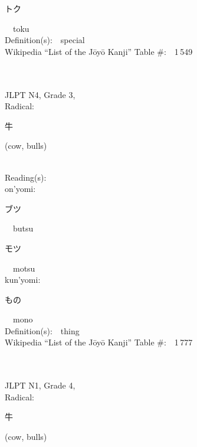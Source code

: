 \begin{multicols}{2}
{\hspace*{2em}}{\begin{CJK}{UTF8}{min} トク \end{CJK}}\ \ toku\ \ \\
Definition(s):\ \ special \\
Wikipedia ``List of the J\=oy\=o Kanji'' Table \#:\ \ 1\,549 \\
\ \ \\
{\fontsize{34pt}{40pt}  }\ \ \\  %
{JLPT N4, Grade 3, \\Radical:\ \ {\begin{CJK}{UTF8}{min} 牛 \end{CJK}} (cow, bulls) } \\
Reading(s):\ \ \\
{\hspace*{1em}}on'yomi:\ \ \\
{\hspace*{2em}}{\begin{CJK}{UTF8}{min} ブツ \end{CJK}}\ \ butsu\ \ \\
{\hspace*{2em}}{\begin{CJK}{UTF8}{min} モツ \end{CJK}}\ \ motsu\ \ \\
{\hspace*{1em}}kun'yomi:\ \ \\
{\hspace*{2em}}{\begin{CJK}{UTF8}{min} もの \end{CJK}}\ \ mono\ \ \\
Definition(s):\ \ thing \\
Wikipedia ``List of the J\=oy\=o Kanji'' Table \#:\ \ 1\,777 \\
\ \ \\
{\fontsize{34pt}{40pt}  }\ \ \\  %
{JLPT N1, Grade 4, \\Radical:\ \ {\begin{CJK}{UTF8}{min} 牛 \end{CJK}} (cow, bulls) } \\

\end{multicols}

